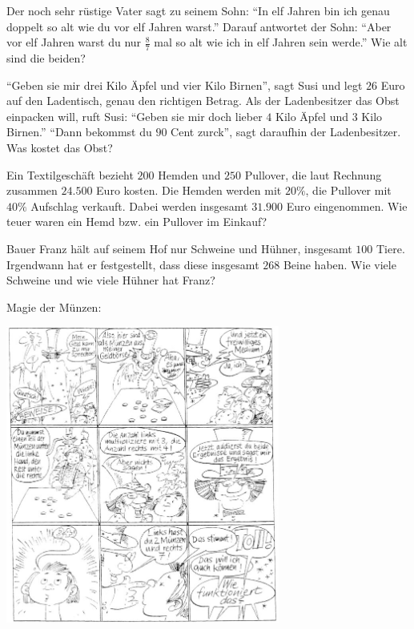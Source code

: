 \documentclass[a4paper, twoside, parskip, 10pt, smallheadings]{scrbook}
\theoremstyle{plain}
\theoremstyle{definition}
\begin{document}



\item Der noch sehr rüstige Vater sagt zu seinem Sohn: "`In elf Jahren bin ich genau doppelt so alt wie du vor elf Jahren warst."' Darauf antwortet der Sohn: "`Aber vor elf Jahren warst du nur $\frac87$ mal so alt wie ich in elf Jahren sein werde."' Wie alt sind die beiden?

\item "`Geben sie mir drei Kilo Äpfel und vier Kilo Birnen"', sagt Susi und legt $26$ Euro auf den Ladentisch, genau den richtigen Betrag. Als der Ladenbesitzer das Obst einpacken will, ruft Susi: "`Geben sie mir doch lieber $4$ Kilo Äpfel und $3$ Kilo Birnen."' "`Dann bekommst du $90$ Cent zurck"', sagt daraufhin der Ladenbesitzer. Was kostet das Obst?

\item Ein Textilgeschäft bezieht $200$ Hemden und $250$ Pullover, die laut Rechnung zusammen $24.500$ Euro kosten. Die Hemden werden mit $20\%$, die Pullover mit $40\%$ Aufschlag verkauft. Dabei werden insgesamt $31.900$ Euro eingenommen. Wie teuer waren ein Hemd bzw. ein Pullover im Einkauf?

\item Bauer Franz hält auf seinem Hof nur Schweine und Hühner, insgesamt $100$ Tiere. Irgendwann hat er festgestellt, dass diese insgesamt $268$ Beine haben. Wie viele Schweine und wie viele Hühner hat Franz?


\item Magie der Münzen:

\begin{center}
\includegraphics[width=9cm]{2te/linearegleichungssysteme/bilder/zauberer.jpg}
\end{center} 
\end{document}
